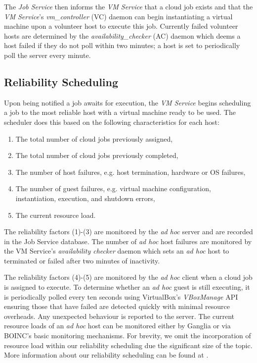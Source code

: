 \documentclass[10pt, conference, compsocconf]{IEEEtran}
\begin{document}
The \textit{Job Service} then informs the \textit{VM Service} that a cloud job exists and that the \textit{VM Service}'s \textit{vm\_controller} (VC) daemon can begin instantiating a virtual machine upon a volunteer host to execute this job. Currently failed volunteer hosts are determined by the \textit{availability\_checker} (AC) daemon which deems a host failed if they do not poll within two minutes; a host is set to periodically poll the server every minute.

\subsection{Reliability Scheduling}
Upon being notified a job awaits for execution, the \textit{VM Service} begins scheduling a job to the most reliable host with a virtual machine  ready to be used. The scheduler does this based on the following characteristics for each host: 

\begin{enumerate}
\item The total number of cloud jobs previously assigned,
\item The total number of cloud jobs previously completed,
\item The number of host failures, e.g. host termination, hardware or OS failures,
\item The number of guest failures, e.g. virtual machine configuration, instantiation, execution, and shutdown errors,
\item The current resource load.
\end{enumerate}
 
\noindent The reliability factors (1)-(3) are monitored by the \textit{ad hoc} server and are recorded in the Job Service database. The number of \textit{ad hoc} host failures are monitored by the VM Service's \textit{availability checker} daemon which sets an \textit{ad hoc} host to terminated or failed after two minutes of inactivity. 

The reliability factors (4)-(5) are monitored by the \textit{ad hoc} client when a cloud job is assigned to execute. To determine whether an \textit{ad hoc} guest is still executing, it is periodically polled every ten seconds using VirtualBox's \textit{VBoxManage} API ensuring those that have failed are detected quickly with minimal resource overheads. Any unexpected behaviour is reported to the server. The current resource loads of an \textit{ad hoc} host can be monitored either by Ganglia or via BOINC's basic monitoring mechanisms. For brevity, we omit the incorporation of resource load within our reliability scheduling due the significant size of the topic. More information about our reliability scheduling can be found at \cite{McGilvary2014}.
\end{document}
